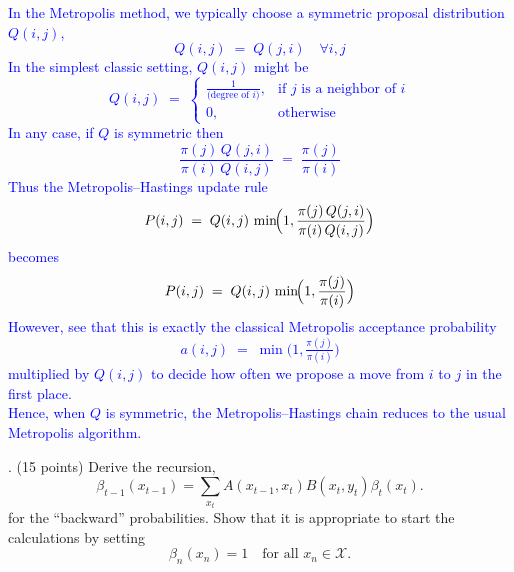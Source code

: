 \documentclass{article}
\begin{document}
\begin{itemize}
    \textcolor{blue}{In the Metropolis method, we typically choose a symmetric proposal distribution $Q(i,j)$, \ 
\[
  Q(i,j)\;=\;Q(j,i)\quad \forall i,j
\]
In the simplest classic setting, $Q(i,j)$ might be 
\[
  Q(i,j) 
  \;=\;
  \begin{cases}
    \frac{1}{\text{(degree of $i$)}}, & \text{if $j$ is a neighbor of $i$}\\[3pt]
    0, & \text{otherwise}
  \end{cases}
\]
In any case, if $Q$ is symmetric then
\[
  \frac{\pi(j)\,Q(j,i)}{\pi(i)\,Q(i,j)}
  \;=\;
  \frac{\pi(j)}{\pi(i)}
\]
Thus the Metropolis--Hastings update rule
\[
  P(i,j) \;=\; Q(i,j)\,\min\!\Bigl(1,\frac{\pi(j)\,Q(j,i)}{\pi(i)\,Q(i,j)}\Bigr)
\]
becomes
\[
  P(i,j) \;=\; Q(i,j)\,\min\!\Bigl(1,\frac{\pi(j)}{\pi(i)}\Bigr)
\]
However, see that this is exactly the classical Metropolis acceptance probability
\[
  a(i,j) 
  \;=\; 
  \min\bigl(1,\tfrac{\pi(j)}{\pi(i)}\bigr)
\]
multiplied by $Q(i,j)$ to decide how often we propose a move from $i$ to $j$ in the first place. \\ 
Hence, when $Q$ is symmetric, the Metropolis--Hastings chain reduces to the usual Metropolis algorithm. 
}

\end{itemize}

. (15 points) Derive the recursion, 
\[
\beta_{t-1}(x_{t-1}) = \sum_{x_t} A(x_{t-1}, x_t) B(x_t, y_t) \beta_t(x_t).
\]
for the “backward” probabilities. Show that it is appropriate to start the calculations by setting
\[
\beta_n(x_n) = 1 \quad \text{for all } x_n \in \mathcal{X}.
\]

\end{document}
